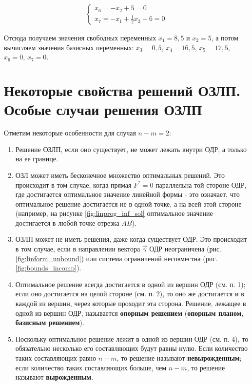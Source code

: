 \documentclass[a4paper,12pt]{report}
\begin{document}
\begin{align*}
\begin{cases}
x_{6} = -x_{2} + 5 = 0\\
x_{7} = -x_{1} + \frac{1}{2}x_{2} + 6 = 0
\end{cases}	
\end{align*}

Отсюда получаем значения свободных переменных $x_{1} = 8,5$ и $x_{2} = 5$, а потом вычисляем значения базисных переменных: $x_{3} = 0,5$, $x_{4} = 16,5$, $x_{5} = 17,5$, $x_{6} = 0$, $x_{7} = 0$.

\section{Некоторые свойства решений ОЗЛП. Особые случаи решения ОЗЛП}
\label{sec:ozlp_spec_prop}
Отметим некоторые особенности для случая $n - m = 2$:
\begin{enumerate}
\item Решение ОЗЛП, если оно существует, не может лежать внутри ОДР, а только на ее границе.
\item ОЗЛ может иметь бесконечное множество оптимальных решений. Это происходит в том случае, когда прямая $F^{*} = 0$ параллельна той стороне ОДР, где достигается оптимальное значение линейной формы - это означает, что оптимальное решение достигается не в одной точке, а на всей этой стороне (например, на рисунке \ref{fig:linprog_inf_sol} оптимальное значение достигается в любой точке отрезка $AB$).
\item ОЗЛП может не иметь решения, даже когда существует ОДР. Это происходит в том случае, если в направлении вектора $\vec{\gamma}$ ОДР неограничена (рис. \ref{fig:linform_unbound}) или система ограничений несовместна (рис. \ref{fig:bounds_incomp}).
\item Оптимальное решение всегда достигается в одной из вершин ОДР (см. п. 1); если оно достигается на целой стороне (см. п. 2), то оно же достигается и в каждой из вершин, через которые проходит эта сторона. Решение, лежащее в одной из вершин ОДР, называется \textbf{опорным решением} (\textbf{опорным планом}, \textbf{базисным решением}).
\item Поскольку оптимальное решение лежит в одной из вершин ОДР (см. п. 4), то обязательно несколько его составляющих будут равны нулю. Если количество таких составляющих равно $n-m$, то решение называют \textbf{невырожденным}; если количество таких составляющих больше, чем $n-m$, то решение называют \textbf{вырожденным}.
\end{enumerate}
\end{document}
